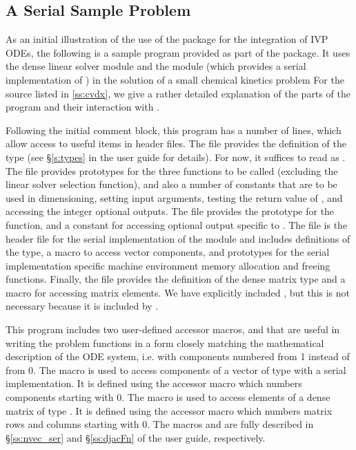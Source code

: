 \subsection{A Serial Sample Problem}\label{ss:serial_sim_ex}

As an initial illustration of the use of the {\cvode} package for the
integration of IVP ODEs, the following is a sample program provided as part 
of the package.  It uses the {\cvode} dense linear solver module {\cvdense} 
and the {\nvecs} module (which provides a serial implementation of {\nvector})
in the solution of a small chemical kinetics problem
For the source listed in \A\ref{ss:cvdx}, we give a rather detailed explanation of 
the parts of the program and their interaction with {\cvode}.

Following the initial comment block, this program has a number
of  lines, which allow access to useful items in {\cvode}
header files.  The  file provides the definition of the
type  (see \S\ref{s:types} in the user guide for
details).  For now, it suffices to read  as .
The  file provides prototypes for the three {\cvode}
functions to be called (excluding the linear solver selection
function), and also a number of constants that are to be used in
dimensioning, setting input arguments, testing the return value of
, and accessing the integer optional outputs.
The  file provides the prototype for the  
function, and a constant  for accessing optional output 
specific to {\cvdense}.  
The  file is the header file for the serial implementation
of the {\nvector} module and includes definitions of the 
 type, a macro to access vector components, and prototypes 
for the serial implementation specific machine environment memory allocation
and freeing functions.
Finally, the  file provides the definition of the dense
matrix type  and a macro for accessing matrix elements.
We have explicitly included , but this is not necessary because 
it is included by .

This program includes two user-defined accessor macros,
 and 
that are useful in writing the problem functions in a form closely
matching the mathematical description of the ODE system, i.e. with
components numbered from 1 instead of from 0. 
The  macro is used to access components of a vector of type 
with a serial implementation. 
It is defined using the {\nvecs} accessor macro  which numbers components 
starting with 0. The  macro is used to access elements of a dense matrix of
type . It is defined using the {\dense} accessor macro 
which numbers matrix rows and columns starting with 0. The macros
 and  are fully described in  \S\ref{ss:nvec_ser} and
\S\ref{ss:djacFn} of the user guide, respectively.

